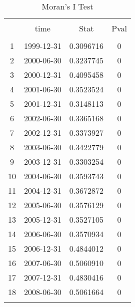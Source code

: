 
\begin{table}[!htbp] \centering 
  \caption{Moran's I Test} 
  \label{} 
\begin{tabular}{@{\extracolsep{5pt}} cccc} 
\\[-1.8ex]\hline 
\hline \\[-1.8ex] 
 & time & Stat & Pval \\ 
\hline \\[-1.8ex] 
1 & 1999-12-31 & 0.3096716 & 0 \\ 
2 & 2000-06-30 & 0.3237745 & 0 \\ 
3 & 2000-12-31 & 0.4095458 & 0 \\ 
4 & 2001-06-30 & 0.3523524 & 0 \\ 
5 & 2001-12-31 & 0.3148113 & 0 \\ 
6 & 2002-06-30 & 0.3365168 & 0 \\ 
7 & 2002-12-31 & 0.3373927 & 0 \\ 
8 & 2003-06-30 & 0.3422779 & 0 \\ 
9 & 2003-12-31 & 0.3303254 & 0 \\ 
10 & 2004-06-30 & 0.3593743 & 0 \\ 
11 & 2004-12-31 & 0.3672872 & 0 \\ 
12 & 2005-06-30 & 0.3576129 & 0 \\ 
13 & 2005-12-31 & 0.3527105 & 0 \\ 
14 & 2006-06-30 & 0.3570934 & 0 \\ 
15 & 2006-12-31 & 0.4844012 & 0 \\ 
16 & 2007-06-30 & 0.5060910 & 0 \\ 
17 & 2007-12-31 & 0.4830416 & 0 \\ 
18 & 2008-06-30 & 0.5061664 & 0 \\ 
\hline \\[-1.8ex] 
\end{tabular} 
\end{table} 
